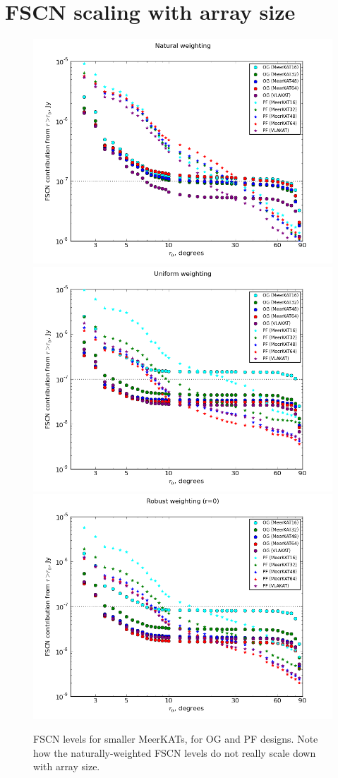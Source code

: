 \documentclass{aa}
\begin{document}
\section{FSCN scaling with array size}
\label{sec:meerkatjes}

\begin{figure}
  \includegraphics[width=.33\textwidth]{cc-meerkatjes-natural}\hfill%
  \includegraphics[width=.33\textwidth]{cc-meerkatjes-uniform}\hfill%
  \includegraphics[width=.33\textwidth]{cc-meerkatjes-robust}
\caption{\label{fig:fscn-meerkatjes}FSCN levels for smaller MeerKATs, for OG and PF designs. Note how the naturally-weighted FSCN levels do not really scale down with array size.}

\end{figure}
\end{document}
